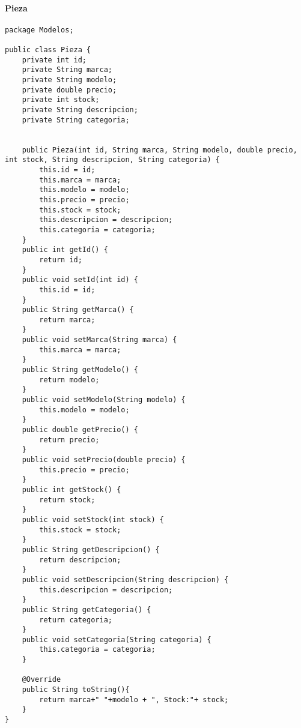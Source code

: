 \documentclass{article}
\begin{document}
\paragraph{Pieza}
\begin{lstlisting}
package Modelos;

public class Pieza {
	private int id;
	private String marca;
	private String modelo;
	private double precio;
	private int stock;
	private String descripcion;
	private String categoria;
	
	
	public Pieza(int id, String marca, String modelo, double precio, int stock, String descripcion, String categoria) {
		this.id = id;
		this.marca = marca;
		this.modelo = modelo;
		this.precio = precio;
		this.stock = stock;
		this.descripcion = descripcion;
		this.categoria = categoria;
	}
	public int getId() {
		return id;
	}
	public void setId(int id) {
		this.id = id;
	}
	public String getMarca() {
		return marca;
	}
	public void setMarca(String marca) {
		this.marca = marca;
	}
	public String getModelo() {
		return modelo;
	}
	public void setModelo(String modelo) {
		this.modelo = modelo;
	}
	public double getPrecio() {
		return precio;
	}
	public void setPrecio(double precio) {
		this.precio = precio;
	}
	public int getStock() {
		return stock;
	}
	public void setStock(int stock) {
		this.stock = stock;
	}
	public String getDescripcion() {
		return descripcion;
	}
	public void setDescripcion(String descripcion) {
		this.descripcion = descripcion;
	}
	public String getCategoria() {
		return categoria;
	}
	public void setCategoria(String categoria) {
		this.categoria = categoria;
	}
	
	@Override
	public String toString(){
		return marca+" "+modelo + ", Stock:"+ stock;
	}
}
\end{lstlisting}
\clearpage
\end{document}
